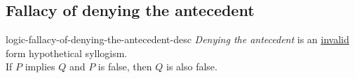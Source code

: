\documentclass[preview]{standalone}
\begin{document}

\subsection{Fallacy of denying the antecedent}

\begin{snippet}{logic-fallacy-of-denying-the-antecedent-desc}
\textit{Denying the antecedent}
is an \underline{invalid} form hypothetical syllogism. \\
If \(P\) implies \(Q\) and \(P\) is false, then \(Q\) is also false.
\end{snippet}

\end{document}
